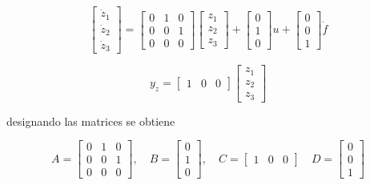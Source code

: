 \begin{equation*}
    \begin{bmatrix}
        \dot{z}_1 \\
        \dot{z}_2 \\
        \dot{z}_3
    \end{bmatrix} = \begin{bmatrix}
        0 & 1 & 0 \\
        0 & 0 & 1 \\
        0 & 0 & 0
    \end{bmatrix} \begin{bmatrix}
        z_1 \\
        z_2 \\
        z_3
    \end{bmatrix} + \begin{bmatrix}
        0 \\
        1 \\
        0
    \end{bmatrix} u + \begin{bmatrix}
        0 \\
        0 \\
        1
    \end{bmatrix} \dot{f}
\end{equation*}

\begin{equation*}
    y_z = \begin{bmatrix}
        1 & 0 & 0
    \end{bmatrix} \begin{bmatrix}
        z_1 \\
        z_2 \\
        z_3
    \end{bmatrix}
\end{equation*}

designando las matrices se obtiene

\begin{equation*}
    A=\begin{bmatrix}
        0 & 1 & 0 \\
        0 & 0 & 1 \\
        0 & 0 & 0
    \end{bmatrix}, \quad
    B=\begin{bmatrix}
        0 \\
        1 \\
        0
    \end{bmatrix}, \quad
    C=\begin{bmatrix}
        1 & 0 & 0
    \end{bmatrix} \quad
    D =\begin{bmatrix}
        0 \\ 0 \\ 1
    \end{bmatrix}
\end{equation*}

